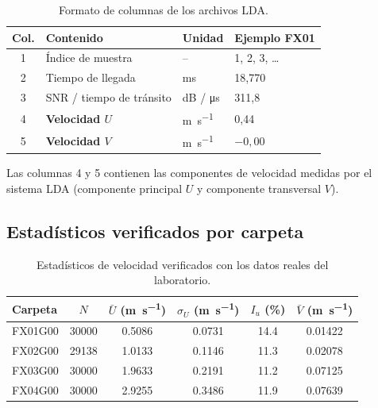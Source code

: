 \documentclass[12pt,a4paper]{article}
\begin{document}
\begin{table}[H]
	\centering
	\caption{Formato de columnas de los archivos LDA.}
	\label{tab:formato}
	\begin{tabular}{c l l l}
		\toprule
		\textbf{Col.} & \textbf{Contenido}       & \textbf{Unidad}
		              & \textbf{Ejemplo FX01}                         \\
		\midrule
		1             & Índice de muestra        & --
		              & 1, 2, 3, \ldots                               \\
		2             & Tiempo de llegada        & ms
		              & 18,770                                        \\
		3             & SNR / tiempo de tránsito & dB / \si{\micro\s}
		              & 311,8                                         \\
		4             & \textbf{Velocidad $U$}   & \si{\m\per\s}
		              & 0,44                                          \\
		5             & \textbf{Velocidad $V$}   & \si{\m\per\s}
		              & $-0{,}00$                                     \\
		\bottomrule
	\end{tabular}
\end{table}

Las columnas 4 y 5 contienen las componentes de velocidad medidas por el
sistema LDA (componente principal $U$ y componente transversal $V$).

\subsection{Estadísticos verificados por carpeta}

\begin{table}[H]
	\centering
	\caption{Estadísticos de velocidad verificados con los datos reales del
		laboratorio.}
	\label{tab:stats_verificados}
	\begin{tabular}{l S[table-format=5.0]
			S[table-format=1.4] S[table-format=1.4]
			S[table-format=2.1] S[table-format=1.5]}
		\toprule
		\textbf{Carpeta}
		        & {$N$}                        & {$\bar{U}$ (\si{\m\per\s})}
		        & {$\sigma_U$ (\si{\m\per\s})}
		        & {$I_u$ (\%)}
		        & {$\bar{V}$ (\si{\m\per\s})}                                                          \\
		\midrule
		FX01G00 & 30000                        & 0.5086                      & 0.0731 & 14.4 & 0.01422 \\
		FX02G00 & 29138                        & 1.0133                      & 0.1146 & 11.3 & 0.02078 \\
		FX03G00 & 30000                        & 1.9633                      & 0.2191 & 11.2 & 0.07125 \\
		FX04G00 & 30000                        & 2.9255                      & 0.3486 & 11.9 & 0.07639 \\
		\bottomrule
	\end{tabular}
\end{table}
\end{document}
